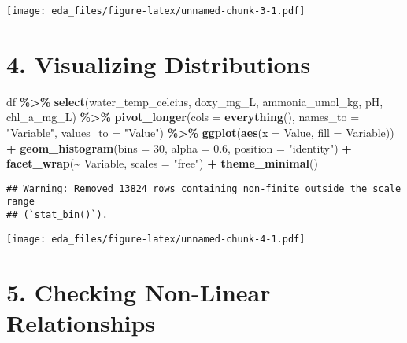 \documentclass[
]{article}
\newenvironment{Shaded}{\begin{snugshade}}{\end{snugshade}}
\newcommand{\AttributeTok}[1]{\textcolor[rgb]{0.13,0.29,0.53}{#1}}
\newcommand{\DecValTok}[1]{\textcolor[rgb]{0.00,0.00,0.81}{#1}}
\newcommand{\FloatTok}[1]{\textcolor[rgb]{0.00,0.00,0.81}{#1}}
\newcommand{\FunctionTok}[1]{\textcolor[rgb]{0.13,0.29,0.53}{\textbf{#1}}}
\newcommand{\NormalTok}[1]{#1}
\newcommand{\SpecialCharTok}[1]{\textcolor[rgb]{0.81,0.36,0.00}{\textbf{#1}}}
\newcommand{\StringTok}[1]{\textcolor[rgb]{0.31,0.60,0.02}{#1}}
\begin{document}
\texttt{[image: eda\_files/figure-latex/unnamed-chunk-3-1.pdf]}

\hypertarget{visualizing-distributions}{%
\section{\texorpdfstring{\textbf{4. Visualizing
Distributions}}{4. Visualizing Distributions}}\label{visualizing-distributions}}

\begin{Shaded}
\begin{Highlighting}[]
\NormalTok{df }\SpecialCharTok{\%\textgreater{}\%}
  \FunctionTok{select}\NormalTok{(water\_temp\_celcius, doxy\_mg\_L, ammonia\_umol\_kg, pH, chl\_a\_mg\_L) }\SpecialCharTok{\%\textgreater{}\%}
  \FunctionTok{pivot\_longer}\NormalTok{(}\AttributeTok{cols =} \FunctionTok{everything}\NormalTok{(), }\AttributeTok{names\_to =} \StringTok{"Variable"}\NormalTok{, }\AttributeTok{values\_to =} \StringTok{"Value"}\NormalTok{) }\SpecialCharTok{\%\textgreater{}\%}
  \FunctionTok{ggplot}\NormalTok{(}\FunctionTok{aes}\NormalTok{(}\AttributeTok{x =}\NormalTok{ Value, }\AttributeTok{fill =}\NormalTok{ Variable)) }\SpecialCharTok{+}
  \FunctionTok{geom\_histogram}\NormalTok{(}\AttributeTok{bins =} \DecValTok{30}\NormalTok{, }\AttributeTok{alpha =} \FloatTok{0.6}\NormalTok{, }\AttributeTok{position =} \StringTok{"identity"}\NormalTok{) }\SpecialCharTok{+}
  \FunctionTok{facet\_wrap}\NormalTok{(}\SpecialCharTok{\textasciitilde{}}\NormalTok{ Variable, }\AttributeTok{scales =} \StringTok{"free"}\NormalTok{) }\SpecialCharTok{+}
  \FunctionTok{theme\_minimal}\NormalTok{()}
\end{Highlighting}
\end{Shaded}

\begin{verbatim}
## Warning: Removed 13824 rows containing non-finite outside the scale range
## (`stat_bin()`).
\end{verbatim}

\texttt{[image: eda\_files/figure-latex/unnamed-chunk-4-1.pdf]}

\hypertarget{checking-non-linear-relationships}{%
\section{\texorpdfstring{\textbf{5. Checking Non-Linear
Relationships}}{5. Checking Non-Linear Relationships}}\label{checking-non-linear-relationships}}
\end{document}
